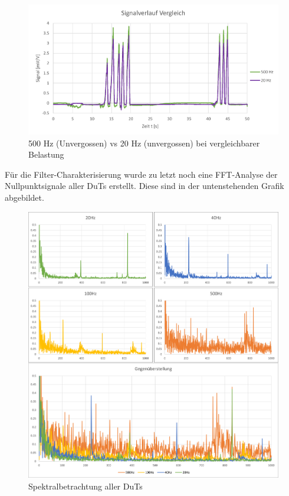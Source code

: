 \begin{figure}[H]
	\centering
	\includegraphics[width=1\linewidth]{imgs/daten_008_kpl}
	\caption{500 Hz (Unvergossen) vs 20 Hz (unvergossen) bei vergleichbarer Belastung}
	\label{fig:daten008kpl}
\end{figure}\noindent
Für die Filter-Charakterisierung wurde zu letzt noch eine FFT-Analyse der Nullpunktsignale aller DuTs erstellt. Diese sind in der untenstehenden Grafik abgebildet.
\begin{figure}[H]
	\centering
	\includegraphics[width=1\linewidth]{imgs/FFT}
	\caption{Spektralbetrachtung aller DuTs}
	\label{fig:fft_all}
\end{figure}

